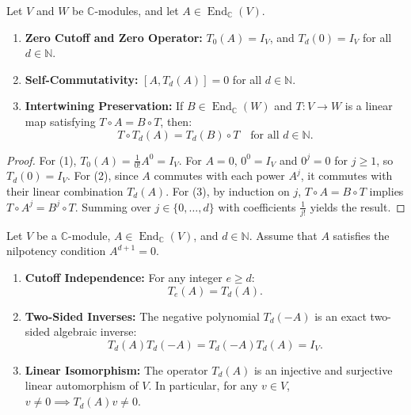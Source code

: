 \begin{lemma}
\label{lem:taylor_basic}
Let $V$ and $W$ be $\mathbb{C}$-modules, and let $A \in \operatorname{End}_{\mathbb{C}}(V)$.
\begin{enumerate}
    \item \textbf{Zero Cutoff and Zero Operator:} $T_0(A) = I_V$, and $T_d(0) = I_V$ for all $d \in \mathbb{N}$.
    \item \textbf{Self-Commutativity:} $[A, T_d(A)] = 0$ for all $d \in \mathbb{N}$.
    \item \textbf{Intertwining Preservation:} If $B \in \operatorname{End}_{\mathbb{C}}(W)$ and $T : V \to W$ is a linear map satisfying $T \circ A = B \circ T$, then:
    \begin{equation}
    T \circ T_d(A) = T_d(B) \circ T \quad \text{for all } d \in \mathbb{N}.
    \end{equation}
\end{enumerate}
\end{lemma}

\begin{proof}
For (1), $T_0(A) = \frac{1}{0!} A^0 = I_V$. For $A = 0$, $0^0 = I_V$ and $0^j = 0$ for $j \ge 1$, so $T_d(0) = I_V$.
For (2), since $A$ commutes with each power $A^j$, it commutes with their linear combination $T_d(A)$.
For (3), by induction on $j$, $T \circ A = B \circ T$ implies $T \circ A^j = B^j \circ T$. Summing over $j \in \{0, \dots, d\}$ with coefficients $\frac{1}{j!}$ yields the result.
\end{proof}

\begin{theorem}
\label{thm:taylor_invertibility}
Let $V$ be a $\mathbb{C}$-module, $A \in \operatorname{End}_{\mathbb{C}}(V)$, and $d \in \mathbb{N}$. Assume that $A$ satisfies the nilpotency condition $A^{d+1} = 0$.
\begin{enumerate}
    \item \textbf{Cutoff Independence:} For any integer $e \ge d$:
    \begin{equation}
    T_e(A) = T_d(A).
    \end{equation}
    \item \textbf{Two-Sided Inverses:} The negative polynomial $T_d(-A)$ is an exact two-sided algebraic inverse:
    \begin{equation}
    T_d(A) T_d(-A) = T_d(-A) T_d(A) = I_V.
    \end{equation}
    \item \textbf{Linear Isomorphism:} The operator $T_d(A)$ is an injective and surjective linear automorphism of $V$. In particular, for any $v \in V$, $v \neq 0 \implies T_d(A) v \neq 0$.
\end{enumerate}
\end{theorem}

